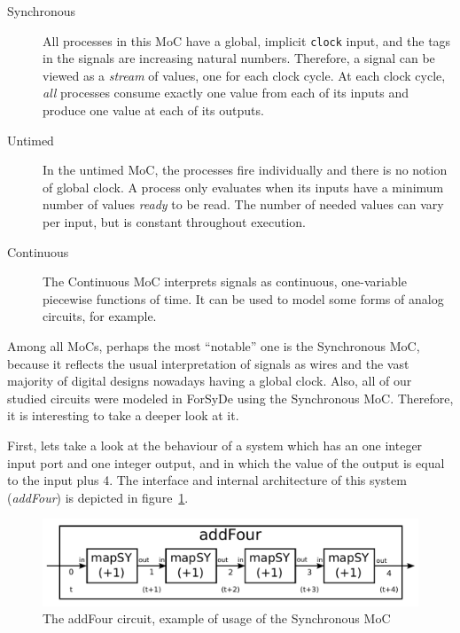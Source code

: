             \begin{description}
                \item[Synchronous] All processes in this \ac{MoC} have a global, implicit
                    \texttt{clock} input, and the tags in the signals are increasing natural
                    numbers. Therefore, a signal can be viewed as a \emph{stream} of values, one for
                    each clock cycle. At each clock cycle, \emph{all} processes consume exactly one
                    value from each of its inputs and produce one value at each of its outputs.

                \item[Untimed] In the untimed \ac{MoC}, the processes fire individually and there is
                    no notion of global clock. A process only evaluates when its inputs have a
                    minimum number of values \emph{ready} to be read. The number of needed values
                    can vary per input, but is constant throughout execution.

                \item[Continuous] The Continuous \ac{MoC} interprets signals as continuous,
                    one-variable piecewise functions of time. It can be used to model some forms of
                    analog circuits, for example.
            \end{description}

            \label{ref:forsyde-moc-synch}
            Among all \acp{MoC}, perhaps the most ``notable'' one is the Synchronous \ac{MoC},
            because it reflects the usual interpretation of signals as wires and the vast majority
            of digital designs nowadays having a global clock. Also, all of our studied circuits
            were modeled in ForSyDe using the Synchronous \ac{MoC}. Therefore, it is interesting to
            take a deeper look at it.

            First, lets take a look at the behaviour of a system which has an one integer input port
            and one integer output, and in which the value of the output is equal to the input plus
            4. The interface and internal architecture of this system (\emph{addFour}) is depicted
            in figure~\ref{fig:forsyde-addFour}.

            \begin{figure}[h!]
                \includegraphics[width=1.0\textwidth]{imgs/forsyde-addFour.pdf}
                \caption{The addFour circuit, example of usage of the Synchronous \ac{MoC}
                    \label{fig:forsyde-addFour}}
            \end{figure}

